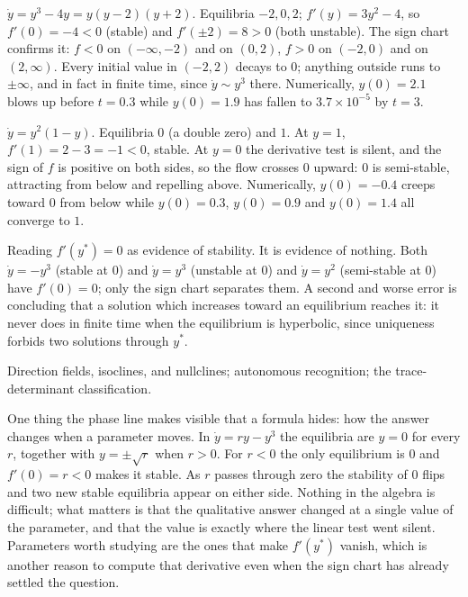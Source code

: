 \begin{worked}
$\dot y=y^{3}-4y=y(y-2)(y+2)$. Equilibria $-2,0,2$; $f'(y)=3y^{2}-4$, so $f'(0)=-4<0$ (stable) and $f'(\pm2)=8>0$ (both unstable). The sign chart confirms it: $f<0$ on $(-\infty,-2)$ and on $(0,2)$, $f>0$ on $(-2,0)$ and on $(2,\infty)$. Every initial value in $(-2,2)$ decays to $0$; anything outside runs to $\pm\infty$, and in fact in finite time, since $\dot y\sim y^{3}$ there. Numerically, $y(0)=2.1$ blows up before $t=0.3$ while $y(0)=1.9$ has fallen to $3.7\times10^{-5}$ by $t=3$.

$\dot y=y^{2}(1-y)$. Equilibria $0$ (a double zero) and $1$. At $y=1$, $f'(1)=2-3=-1<0$, stable. At $y=0$ the derivative test is silent, and the sign of $f$ is positive on both sides, so the flow crosses $0$ upward: $0$ is semi-stable, attracting from below and repelling above. Numerically, $y(0)=-0.4$ creeps toward $0$ from below while $y(0)=0.3$, $y(0)=0.9$ and $y(0)=1.4$ all converge to $1$.
\end{worked}

\begin{trap}
Reading $f'(y^{*})=0$ as evidence of stability. It is evidence of nothing. Both $\dot y=-y^{3}$ (stable at $0$) and $\dot y=y^{3}$ (unstable at $0$) and $\dot y=y^{2}$ (semi-stable at $0$) have $f'(0)=0$; only the sign chart separates them. A second and worse error is concluding that a solution which increases toward an equilibrium reaches it: it never does in finite time when the equilibrium is hyperbolic, since uniqueness forbids two solutions through $y^{*}$.
\end{trap}

\begin{seealsob}Direction fields, isoclines, and nullclines; autonomous recognition; the trace-determinant classification.\end{seealsob}

One thing the phase line makes visible that a formula hides: how the answer changes when a parameter moves. In $\dot y=ry-y^{3}$ the equilibria are $y=0$ for every $r$, together with $y=\pm\sqrt r$ when $r>0$. For $r<0$ the only equilibrium is $0$ and $f'(0)=r<0$ makes it stable. As $r$ passes through zero the stability of $0$ flips and two new stable equilibria appear on either side. Nothing in the algebra is difficult; what matters is that the qualitative answer changed at a single value of the parameter, and that the value is exactly where the linear test went silent. Parameters worth studying are the ones that make $f'(y^{*})$ vanish, which is another reason to compute that derivative even when the sign chart has already settled the question.

